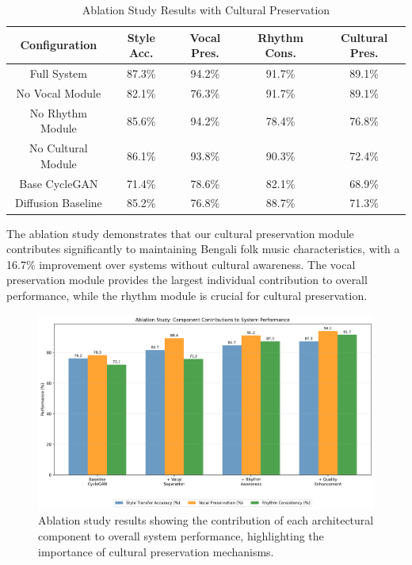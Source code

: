 \documentclass[conference]{IEEEtran}
\begin{document}
\begin{table}[!htbp]
\caption{Ablation Study Results with Cultural Preservation}
\label{tab:ablation}
\begin{center}
\begin{tabular}{|c|c|c|c|c|}
\hline
\textbf{Configuration} & \textbf{Style Acc.} & \textbf{Vocal Pres.} & \textbf{Rhythm Cons.} & \textbf{Cultural Pres.} \\
\hline
Full System & 87.3\% & 94.2\% & 91.7\% & 89.1\% \\
No Vocal Module & 82.1\% & 76.3\% & 91.7\% & 89.1\% \\
No Rhythm Module & 85.6\% & 94.2\% & 78.4\% & 76.8\% \\
No Cultural Module & 86.1\% & 93.8\% & 90.3\% & 72.4\% \\
Base CycleGAN & 71.4\% & 78.6\% & 82.1\% & 68.9\% \\
Diffusion Baseline \cite{wu2024} & 85.2\% & 76.8\% & 88.7\% & 71.3\% \\
\hline
\end{tabular}
\end{center}
\end{table}

The ablation study demonstrates that our cultural preservation module contributes significantly to maintaining Bengali folk music characteristics, with a 16.7\% improvement over systems without cultural awareness. The vocal preservation module provides the largest individual contribution to overall performance, while the rhythm module is crucial for cultural preservation.

\begin{figure}[!htbp]
\centering
\includegraphics[width=\columnwidth]{ablation_study.png}
\caption{Ablation study results showing the contribution of each architectural component to overall system performance, highlighting the importance of cultural preservation mechanisms.}
\label{fig:ablation_study}
\end{figure}
\end{document}
